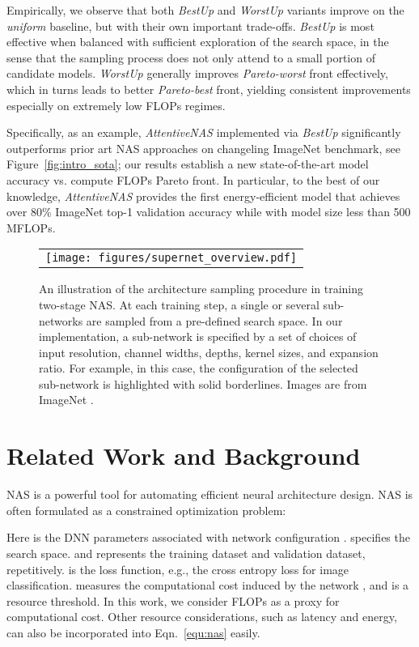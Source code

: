 \documentclass[final]{cvpr}
\theoremstyle{definition}
\begin{document}
Empirically, we observe that both \emph{BestUp} and \emph{WorstUp} variants improve on the \emph{uniform} baseline, but with their own important trade-offs. 
\emph{BestUp} is most effective when balanced with sufficient exploration of the search space, in the sense that the sampling process does not only attend to a small 
portion of candidate models. 
\emph{WorstUp} generally improves \emph{Pareto-worst} front effectively, 
which in turns leads to better \emph{Pareto-best} front, yielding 
consistent improvements especially on extremely low FLOPs regimes. 


Specifically, as an example, \emph{AttentiveNAS} implemented via \emph{BestUp} significantly outperforms prior art NAS approaches on changeling ImageNet benchmark, see Figure~\ref{fig:intro_sota};
our results establish a new state-of-the-art model accuracy vs.  compute FLOPs Pareto front.  In particular,  to the best of our knowledge, \emph{AttentiveNAS} 
provides the first energy-efficient model that achieves  over 80\% ImageNet top-1 validation accuracy while with model size less than 500 MFLOPs. 

\fi 
\begin{figure*}[ht]
\centering
\begin{tabular}{c}
\texttt{[image: figures/supernet\_overview.pdf]} 
\end{tabular}
\caption{
An illustration of the architecture sampling procedure in training two-stage NAS. 
At each training step, a single or several sub-networks are sampled from a pre-defined search space.
In our implementation, a sub-network is specified by a set of choices of input resolution, channel widths, depths, kernel sizes, and expansion ratio. 
For example, in this case, the configuration of the selected sub-network is highlighted with solid borderlines. 
Images are from ImageNet \cite{deng2009imagenet}.
}
\label{fig:superent_training}
\end{figure*}

\section{Related Work and Background}

NAS is a powerful tool for automating efficient neural architecture design.
NAS is often formulated as a constrained optimization problem:

Here  is the DNN parameters associated with network configuration . 
 specifies the search space. 
 and  represents the training dataset and validation dataset, repetitively. 
 is the loss function, e.g., the cross entropy 
loss for image classification. 
 measures the computational cost induced by the 
network , and  is a resource threshold. 
In this work, we consider FLOPs as a proxy for computational cost. 
Other resource considerations, such as latency and energy, can also be incorporated into Eqn.~\eqref{equ:nas} easily.
\end{document}
